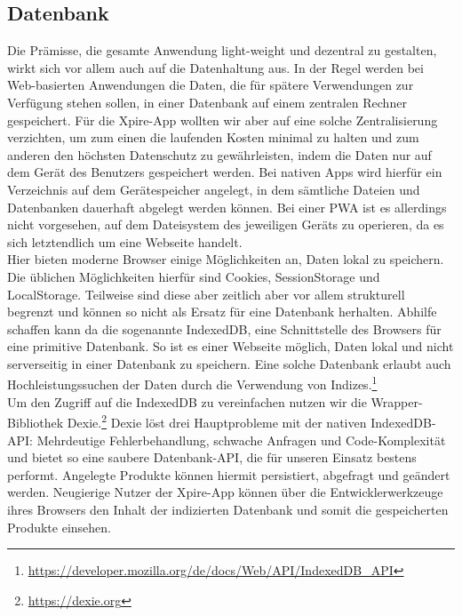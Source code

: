 \subsection{Datenbank}\label{chapter:datenbank}
Die Prämisse, die gesamte Anwendung light-weight und dezentral zu gestalten, wirkt sich vor allem auch auf die Datenhaltung aus. In der Regel werden bei Web-basierten Anwendungen die Daten, die für spätere Verwendungen zur Verfügung stehen sollen, in einer Datenbank auf einem zentralen Rechner gespeichert. Für die Xpire-App wollten wir aber auf eine solche Zentralisierung verzichten, um zum einen die laufenden Kosten minimal zu halten und zum anderen den höchsten Datenschutz zu gewährleisten, indem die Daten nur auf dem Gerät des Benutzers gespeichert werden. Bei nativen Apps wird hierfür ein Verzeichnis auf dem Gerätespeicher angelegt, in dem sämtliche Dateien und Datenbanken dauerhaft abgelegt werden können. Bei einer \ac{PWA} ist es allerdings nicht vorgesehen, auf dem Dateisystem des jeweiligen Geräts zu operieren, da es sich letztendlich um eine Webseite handelt.\\
Hier bieten moderne Browser einige Möglichkeiten an, Daten lokal zu speichern. Die üblichen Möglichkeiten hierfür sind Cookies, SessionStorage und LocalStorage. Teilweise sind diese aber zeitlich aber vor allem strukturell begrenzt und können so nicht als Ersatz für eine Datenbank herhalten. Abhilfe schaffen kann da die sogenannte IndexedDB, eine Schnittstelle des Browsers für eine primitive Datenbank. So ist es einer Webseite möglich, Daten lokal und nicht serverseitig in einer Datenbank zu speichern. Eine solche Datenbank erlaubt auch Hochleistungssuchen der Daten durch die Verwendung von Indizes.\footnote{\url{https://developer.mozilla.org/de/docs/Web/API/IndexedDB_API}}\\
Um den Zugriff auf die IndexedDB zu vereinfachen nutzen wir die Wrapper-Bibliothek Dexie.\footnote{\url{https://dexie.org}} 
Dexie löst drei Hauptprobleme mit der nativen IndexedDB-API:
Mehrdeutige Fehlerbehandlung, schwache Anfragen und
Code-Komplexität und bietet so eine saubere Datenbank-API, die für unseren Einsatz bestens performt. Angelegte Produkte können hiermit persistiert, abgefragt und geändert werden. Neugierige Nutzer der Xpire-App können über die Entwicklerwerkzeuge ihres Browsers den Inhalt der indizierten Datenbank und somit die gespeicherten Produkte einsehen. 
	

